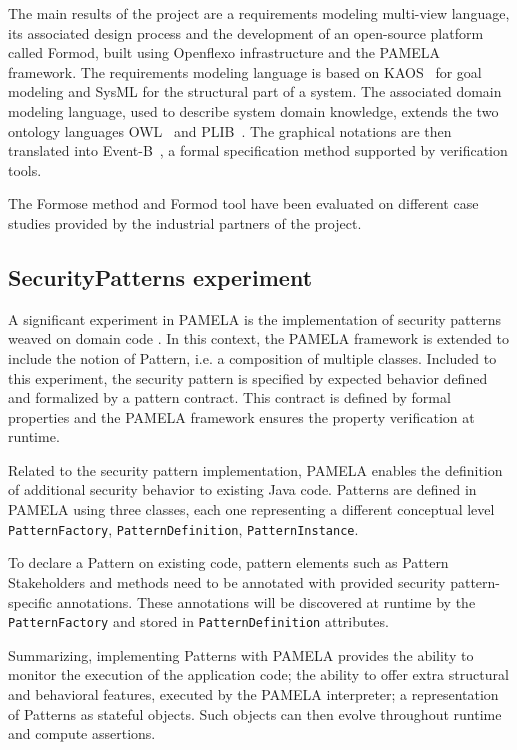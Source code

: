 The main results of the project are a requirements modeling multi-view
language, its associated design process and the development of an open-source
platform called Formod\cite{FormodWebSite}, built using Openflexo
infrastructure and the PAMELA framework. %
The requirements modeling language is based on KAOS~\cite{kaos} for goal
modeling and SysML for the structural part of a system. The associated domain
modeling language, used to describe system domain knowledge, extends the two
ontology languages OWL~\cite{owl} and PLIB~\cite{plib}. The graphical notations
are then translated into Event-B~\cite{eventb}, a formal specification method supported by verification tools. 


The Formose method and Formod tool have been evaluated on different case studies provided by the industrial partners of the project.



\subsection{SecurityPatterns experiment}

A significant experiment in PAMELA is the implementation of security patterns weaved on domain code \cite{silva20}.
In this context, the PAMELA framework is extended to include the notion of Pattern, i.e. a composition of multiple classes. Included to this experiment, the security pattern is specified by expected behavior defined and formalized by a pattern contract. This contract is defined by formal properties and the PAMELA framework ensures the property verification at runtime.

Related to the security pattern implementation, PAMELA enables the definition of additional security behavior to existing Java code.
Patterns are defined in PAMELA using three classes, each one representing a different conceptual level \texttt{PatternFactory}, \texttt{PatternDefinition}, \texttt{PatternInstance}.

To declare a Pattern on existing code, pattern elements such as Pattern Stakeholders and methods need to be annotated with provided security pattern-specific annotations. These annotations will be discovered at runtime by the \texttt{PatternFactory} and stored in \texttt{PatternDefinition} attributes.


Summarizing, implementing Patterns with PAMELA provides the ability to monitor the execution of the application code; the ability to offer extra structural and behavioral features, executed by the PAMELA interpreter; a representation of Patterns as stateful objects. Such objects can then evolve throughout runtime and compute assertions.








